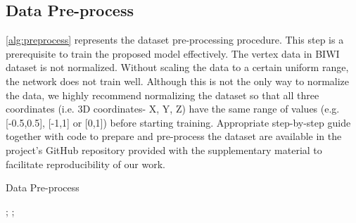 \documentclass[10pt,twocolumn,letterpaper]{article}
\begin{document}
\subsection{Data Pre-process}
\cref{alg:preprocess} represents the dataset pre-processing procedure. This step is a prerequisite to train the proposed model effectively. The vertex data in BIWI dataset is not normalized. Without scaling the data to a certain uniform range, the network does not train well. Although this is not the only way to normalize the data, we highly recommend normalizing the dataset so that all three coordinates (i.e. 3D coordinates- X, Y, Z) have the same range of values (e.g. [-0.5,0.5], [-1,1] or [0,1]) before starting training. Appropriate step-by-step guide together with code to prepare and pre-process the dataset are available in the project's GitHub repository provided with the supplementary material to facilitate reproducibility of our work.   

\begin{algorithm}
\caption{Data Pre-process}\label{alg:preprocess}
\begin{algorithmic}

\State 
\State 

\State 
\State ; ;  


\State 
\State 
\State 

\State 





\State 
\newline
\State 
\newline
\State 


\State 
\State 
\State 

\EndWhile

\State 

\EndWhile

\EndWhile

\end{algorithmic}
\end{algorithm}
\end{document}
